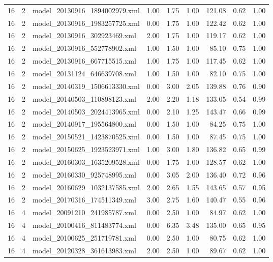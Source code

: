 \begin{table}[ht]
\begin{tabular}{rrlrrrrrr}
   16 &   2 & model\_20130916\_1894002979.xml & 1.00 & 1.75 & 1.00 & 121.08 & 0.62 & 1.00 \\ 
   16 &   2 & model\_20130916\_1983257725.xml & 0.00 & 1.75 & 1.00 & 122.42 & 0.62 & 1.00 \\ 
   16 &   2 & model\_20130916\_302923469.xml & 2.00 & 1.75 & 1.00 & 119.17 & 0.62 & 1.00 \\ 
   16 &   2 & model\_20130916\_552778902.xml & 1.00 & 1.50 & 1.00 & 85.10 & 0.75 & 1.00 \\ 
   16 &   2 & model\_20130916\_667715515.xml & 1.00 & 1.75 & 1.00 & 117.45 & 0.62 & 1.00 \\ 
   16 &   2 & model\_20131124\_646639708.xml & 1.00 & 1.50 & 1.00 & 82.10 & 0.75 & 1.00 \\ 
   16 &   2 & model\_20140319\_1506613330.xml & 0.00 & 3.00 & 2.05 & 139.88 & 0.76 & 0.90 \\ 
   16 &   2 & model\_20140503\_110898123.xml & 2.00 & 2.20 & 1.18 & 133.05 & 0.54 & 0.99 \\ 
   16 &   2 & model\_20140503\_2024413965.xml & 0.00 & 2.10 & 1.25 & 143.47 & 0.66 & 0.99 \\ 
   16 &   2 & model\_20140917\_195564800.xml & 0.00 & 1.50 & 1.00 & 84.25 & 0.75 & 1.00 \\ 
   16 &   2 & model\_20150521\_1423870525.xml & 0.00 & 1.50 & 1.00 & 87.45 & 0.75 & 1.00 \\ 
   16 &   2 & model\_20150625\_1923523971.xml & 1.00 & 3.00 & 1.80 & 136.82 & 0.65 & 0.99 \\ 
   16 &   2 & model\_20160303\_1635209528.xml & 0.00 & 1.75 & 1.00 & 128.57 & 0.62 & 1.00 \\ 
   16 &   2 & model\_20160330\_925748995.xml & 0.00 & 3.05 & 2.00 & 136.40 & 0.72 & 0.96 \\ 
   16 &   2 & model\_20160629\_1032137585.xml & 2.00 & 2.65 & 1.55 & 143.65 & 0.57 & 0.95 \\ 
   16 &   2 & model\_20170316\_174511349.xml & 3.00 & 2.75 & 1.60 & 140.47 & 0.55 & 0.96 \\ 
   16 &   4 & model\_20091210\_241985787.xml & 0.00 & 2.50 & 1.00 & 84.97 & 0.62 & 1.00 \\ 
   16 &   4 & model\_20100416\_811483774.xml & 0.00 & 6.35 & 3.48 & 135.00 & 0.65 & 0.95 \\ 
   16 &   4 & model\_20100625\_251719781.xml & 0.00 & 2.50 & 1.00 & 80.75 & 0.62 & 1.00 \\ 
   16 &   4 & model\_20120328\_361613983.xml & 2.00 & 2.50 & 1.00 & 89.67 & 0.62 & 1.00 \\ 

\end{tabular}
\end{table}
